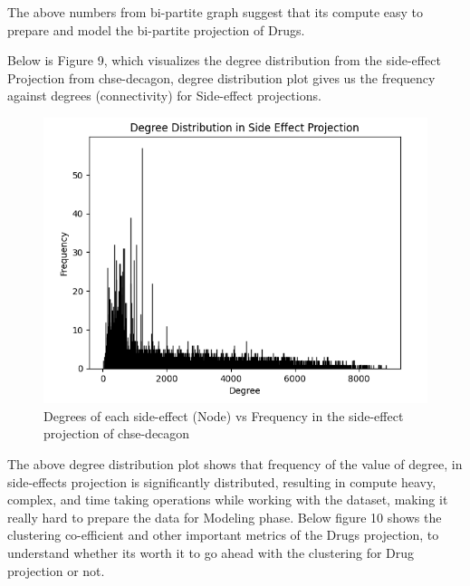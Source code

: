 \documentclass[journal,transmag]{J-NaNA}
\begin{document}
The above numbers from bi-partite graph suggest that its compute easy to prepare and model the bi-partite projection of Drugs.

Below is Figure 9, which visualizes the degree distribution from the side-effect Projection from chse-decagon, degree distribution plot gives us the frequency against degrees (connectivity) for Side-effect projections. 

\begin{figure}[htbp]
\centering
\includegraphics[width=\linewidth]{degree_projection_se_bipartite.PNG} 
\caption{Degrees of each side-effect (Node) vs Frequency in the side-effect projection of chse-decagon}
\label{fig: chse-decagon side-effect bi-partite details} %
\end{figure}

The above degree distribution plot shows that frequency of the value of degree, in side-effects projection is significantly distributed, resulting in compute heavy, complex, and time taking operations while working with the dataset, making it really hard to prepare the data for Modeling phase. Below figure 10 shows the clustering co-efficient and other important metrics of the Drugs projection, to understand whether its worth it to go ahead with the clustering for Drug projection or not. 
\end{document}
